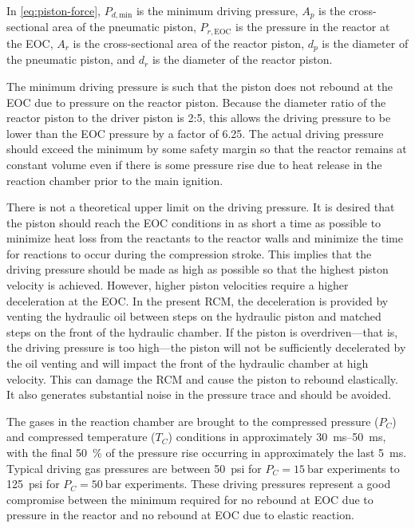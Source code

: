 \documentclass[../main.tex]{subfiles}
\begin{document}
In \cref{eq:piston-force}, $P_{d,\text{min}}$ is the minimum
driving pressure, $A_p$ is the cross-sectional area of the pneumatic piston,
$P_{r,\text{EOC}}$ is the pressure in the reactor at the EOC,
$A_r$ is the cross-sectional area of the reactor piston, $d_p$ is the diameter
of the pneumatic piston, and $d_r$ is the diameter of the reactor piston.

The minimum driving pressure is such that the piston does not rebound at
the EOC due to pressure on the reactor piston. Because the diameter ratio of
the reactor piston to the driver piston is 2:5, this allows the driving pressure
to be lower than the EOC pressure by a factor of 6.25. The actual driving
pressure should exceed the minimum by some safety margin so that the
reactor remains at constant volume even if there is some pressure rise
due to heat release in the reaction chamber prior to the main ignition.

There is not a theoretical upper limit on the driving pressure. It is desired that the piston should
reach the EOC conditions in as short a time as possible to minimize heat
loss from the reactants to the reactor walls and minimize the time for
reactions to occur during the compression stroke. This implies that the
driving pressure should be made as high as possible so that the highest
piston velocity is achieved. However, higher piston velocities require
a higher deceleration at the EOC. In the present RCM, the deceleration
is provided by venting the hydraulic oil between steps on the hydraulic
piston and matched steps on the front of the hydraulic chamber. If the
piston is overdriven---that is, the driving pressure is too high---the
piston will not be sufficiently decelerated by the oil venting and will
impact the front of the hydraulic chamber at high velocity. This can damage
the RCM and cause the piston to rebound elastically. It also generates
substantial noise in the pressure trace and should be avoided.

The gases in the reaction chamber are brought to the compressed pressure ($P_C$) and
compressed temperature ($T_C$) conditions in approximately
\SIrange{30}{50}{\milli\second}, with the final \SI{50}{\percent} of
the pressure rise occurring in approximately the last \SI{5}{\milli\second}.
Typical driving gas pressures are between \SI{50}{psi} for $P_C = \SI{15}{\bar}$ experiments
to  \SI{125}{psi} for $P_C = \SI{50}{\bar}$ experiments. These driving pressures represent a
good compromise between the minimum required for no rebound at EOC due
to pressure in the reactor and no rebound at EOC due to elastic reaction.
\end{document}

